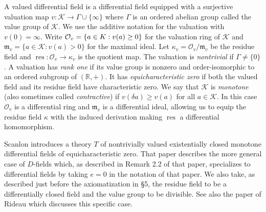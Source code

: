 \documentclass[12pt]{amsart}
\theoremstyle{definition}
\numberwithin{subcase}{cases}
\theoremstyle{remark}
\DeclareMathOperator{\res}{res}
\begin{document}
A valued differential field is a differential field equipped with a surjective valuation map $v:\mathcal K\to\Gamma \cup \{ \infty\}$ where $\Gamma$ is an ordered abelian group called the value group of $\mathcal K$. We use the additive notation for the valuation with $v(0) = \infty$. Write $\mathcal O_v=\{a\in\mathcal \mathcal K:v(a)\ge0\}$ for the valuation ring of $\mathcal K$ and $\mathfrak{m}_v=\{a\in\mathcal K:v(a)>0\}$ for the maximal ideal. Let $\kappa_v=\mathcal O_v/\mathfrak m_v$ be the residue field and $\res:\mathcal O_v\to\kappa_v$ is the quotient map. The valuation is \emph{nontrivial} if $\Gamma\ne\{0\}$.
A valuation has \emph{rank one} if its value group is nonzero and
order-isomorphic to an ordered subgroup of $(\mathbb R,+)$.
It has \emph{equicharacteristic zero} if both the valued field and its
residue field have characteristic zero. We say that $\mathcal K$ is \emph{monotone} (also sometimes called \emph{contractive}) if $v(\delta a) \geq v(a)$ for all $a \in \mathcal K$. In this case $\mathcal O_v$ is a differential ring and $\mathfrak m_v$ is a differential ideal, allowing us to equip the residue field $\kappa$ with the induced derivation making $\res$ a differential homomorphism.

Scanlon \cite{Scanlon00} introduces a theory $T$ of nontrivially
valued existentially closed monotone differential fields of
equicharacteristic zero. That paper describes the more general case of $D$-fields which, as described in Remark 2.2 of that paper, specializes to differential fields by taking $e = 0$ in the notation of that paper. We also take, as described just before the axiomatization in \S 5, the residue field to be a differentially closed field and the value group to be divisible. See also the paper \cite{Rideau19} of Rideau which discusses this specific case.
\end{document}
